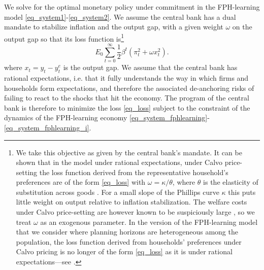 \documentclass{article}
\begin{document}
We solve for the optimal monetary policy under commitment in the FPH-learning model \eqref{eq_system1}-\eqref{eq_system2}. We assume the central bank has a dual mandate to stabilize inflation and the output gap, with a given weight $\omega$ on the output gap so that its loss function is\footnote{We take this objective as given by the central bank's mandate. It can be shown that in the model under rational expectations, under Calvo price-setting the loss function derived from the representative household's preferences are of the form \eqref{eq_loss} with $\omega = \kappa/\theta$, where $\theta$ is the elasticity of substitution across goods \cite[][, chapter 6]{Woodford}. For a small slope of the Phillips curve $\kappa$ this puts little weight on output relative to inflation stabilization. The welfare costs under Calvo price-setting are however known to be suspiciously large \citep{Nakamuraetal2018}, so we treat $\omega$ as an exogenous parameter. In the version of the FPH-learning model that we consider where planning horizons are heterogeneous among the population, the loss function derived from households' preferences under Calvo pricing is no longer of the form \eqref{eq_loss} as it is under rational expectations---see \cite{WoodfordXie2020}.}
\begin{equation}
E_0 \sum_{t=0}^{\infty}\frac{1}{2} \beta^t \left(\pi_t^2 + \omega x_t^2\right).\label{eq_loss}
\end{equation}
where $x_t = y_t - y_t^e$ is the output gap. We assume that the central bank has rational expectations, i.e. that it fully understands the way in which firms and households form expectations, and therefore the associated de-anchoring risks of failing to react to the shocks that hit the economy. The program of the central bank is therefore to minimize the loss \eqref{eq_loss} subject to the constraint of the dynamics of the FPH-learning economy \eqref{eq_system_fphlearning}-\eqref{eq_system_fphlearning_i}.
\end{document}
